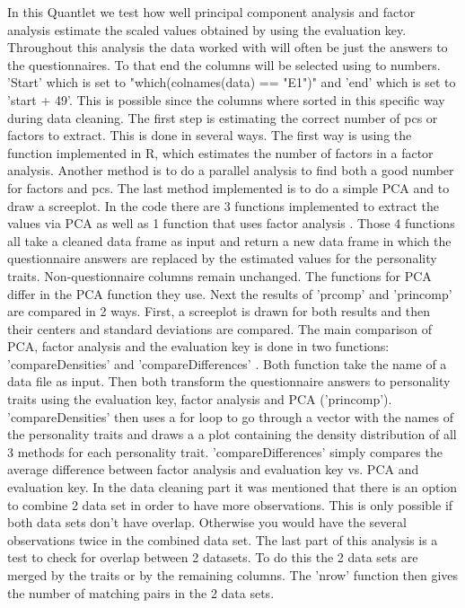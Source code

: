 In this Quantlet we test how well principal component analysis and factor analysis estimate the scaled values obtained by using the evaluation key. Throughout this analysis the data worked with will often be just the answers to the questionnaires. To that end the columns will be selected using to numbers. 'Start' which is set to "which(colnames(data) == "E1")" and 'end' which is set to 'start + 49'. This is possible since the columns where sorted in this specific way during data cleaning.
\newline
The first step is estimating the correct number of pcs or factors to extract. This is done in several ways.
The first way is using the function implemented in R, which estimates the number of factors in a factor analysis. Another method is to do a parallel analysis to find both a good number for factors and pcs. The last method implemented is to do a simple PCA and to draw a screeplot. 
\newline
In the code there are 3 functions implemented to extract the values via PCA as well as 1 function that uses factor analysis . Those 4 functions all take a cleaned data frame as input and return a new data frame in which the questionnaire answers are replaced by the estimated values for the personality traits. Non-questionnaire columns remain unchanged. The functions for PCA differ in the PCA function they use.  
\newline
Next the results of 'prcomp' and 'princomp' are compared in 2 ways. First, a screeplot is drawn for both results and then their centers and standard deviations are compared.
\newline
The main comparison of PCA, factor analysis and the evaluation key is done in two functions: 'compareDensities' and 'compareDifferences' . Both function take the name of a data file as input. Then both transform the questionnaire answers to personality traits using the evaluation key, factor analysis and PCA ('princomp'). 'compareDensities' then uses a for loop to go through a vector with the names of the personality traits and draws a a plot containing the density distribution of all 3 methods for each personality trait.
\newline
'compareDifferences' simply compares the average difference between factor analysis and evaluation key vs. PCA and evaluation key.
\newline
In the data cleaning part it was mentioned that there is an option to combine 2 data set in order to have more observations. This is only possible if both data sets don't have overlap. Otherwise you would have the several observations twice in the combined data set. 
\newline
The last part of this analysis is a test to check for overlap between 2 datasets. To do this the 2 data sets are merged by the traits or by the remaining columns. The 'nrow' function then gives the number of matching pairs in the 2 data sets.  

